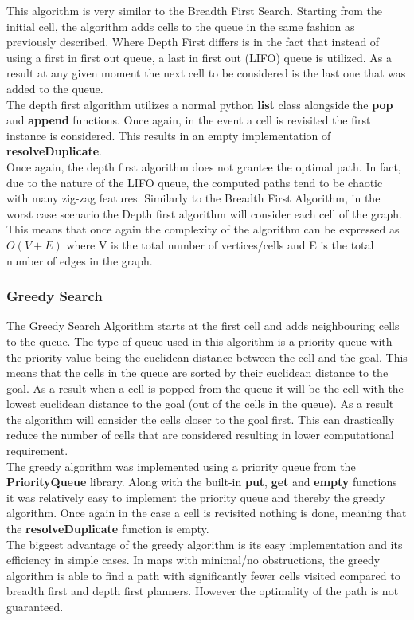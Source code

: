 \documentclass[a4paper,12pt]{article}
\begin{document}
				This algorithm is very similar to the Breadth First Search. Starting from the initial cell, the algorithm adds cells to the queue in the same fashion as previously described. Where Depth First differs is in the fact that instead of using a first in first out queue, a last in first out (LIFO) queue is utilized. As a result at any given moment the next cell to be considered is the last one that was added to the queue. 
				\\
				The depth first algorithm utilizes a normal python \textbf{list} class alongside the \textbf{pop} and \textbf{append} functions. Once again, in the event a cell is revisited the first instance is considered. This results in an empty implementation of \textbf{resolveDuplicate}. 
				\\
				Once again, the depth first algorithm does not grantee the optimal path. In fact, due to the nature of the LIFO queue, the computed paths tend to be chaotic with many zig-zag features. Similarly to the Breadth First Algorithm, in the worst case scenario the Depth first algorithm will consider each cell of the graph. This means that once again the complexity of the algorithm can be expressed as $O(V+E)$ where V is the total number of vertices/cells and E is the total number of edges in the graph.
			
			\subsubsection{Greedy Search}
			
				The Greedy Search Algorithm starts at the first cell and adds neighbouring cells to the queue. The type of queue used in this algorithm is a priority queue with the priority value being the euclidean distance between the cell and the goal. This means that the cells in the queue are sorted by their euclidean distance to the goal. As a result when a cell is popped from the queue it will be the cell with the lowest euclidean distance to the goal (out of the cells in the queue). As a result the algorithm will consider the cells closer to the goal first. This can drastically reduce the number of cells that are considered resulting in lower computational requirement.
				\\
				The greedy algorithm was implemented using a priority queue from the \textbf{PriorityQueue} library. Along with the built-in \textbf{put}, \textbf{get} and \textbf{empty} functions it was relatively easy to implement the priority queue and thereby the greedy algorithm. Once again in the case a cell is revisited nothing is done, meaning that the \textbf{resolveDuplicate} function is empty.
				\\
				The biggest advantage of the greedy algorithm is its easy implementation and its efficiency in simple cases. In maps with minimal/no obstructions, the greedy algorithm is able to find a path with significantly fewer cells visited compared to breadth first and depth first planners. However the optimality of the path is not guaranteed.
				
\end{document}
